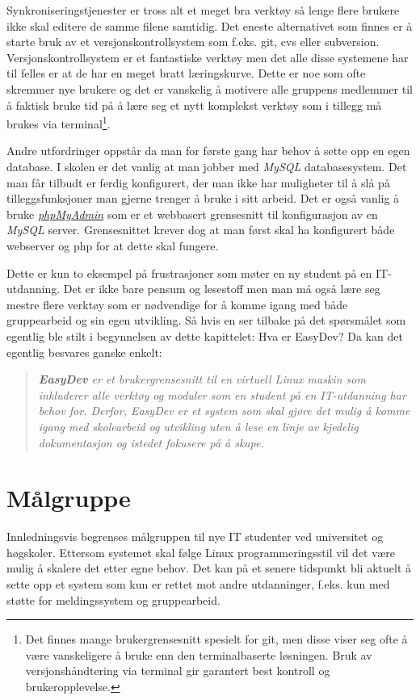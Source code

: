 Synkroniseringstjenester er tross alt et meget bra verktøy så lenge flere brukere ikke skal editere de samme filene samtidig. Det eneste alternativet som finnes er å starte bruk av et versjonskontrollsystem som f.eks. git, cvs eller subversion. Versjonskontrollsystem er et fantastiske verktøy men det alle disse systemene har til felles er at de har en meget bratt læringskurve. Dette er noe som ofte skremmer nye brukere og det er vanskelig å motivere alle gruppens medlemmer til å faktisk bruke tid på å lære seg et nytt komplekst verktøy som i tillegg må brukes via terminal\footnote{Det finnes mange brukergrensesnitt spesielt for git, men disse viser seg ofte å være vanskeligere å bruke enn den terminalbaserte løsningen. Bruk av versjonshåndtering via terminal gir garantert best kontroll og brukeropplevelse.}.

Andre utfordringer oppstår da man for første gang har behov å sette opp en egen database. I skolen er det vanlig at man jobber med \textit{MySQL} databasesystem. Det man får tilbudt er ferdig konfigurert, der man ikke har muligheter til å slå på tilleggsfunksjoner man gjerne trenger å bruke i sitt arbeid. Det er også vanlig å bruke \href{http://en.wikipedia.org/wiki/PhpMyAdmin}{\textit{phpMyAdmin}} som er et webbasert grensesnitt til konfigurasjon av en \textit{MySQL} server. Grensesnittet krever dog at man først skal ha konfigurert både webserver og php for at dette skal fungere.

Dette er kun to eksempel på frustrasjoner som møter en ny student på en IT-utdanning. Det er ikke bare pensum og lesestoff men man må også lære seg mestre flere verktøy som er nødvendige for å komme igang med både gruppearbeid og sin egen utvikling. Så hvis en ser tilbake på det spørsmålet som egentlig ble stilt i begynnelsen av dette kapittelet: Hva er EasyDev? Da kan det egentlig besvares ganske enkelt: 

\begin{quotation}
\emph{\textbf{EasyDev} er et brukergrensesnitt til en virtuell Linux maskin som inkluderer alle verktøy og moduler som en student på en IT-utdanning har behov for. Derfor, EasyDev er et system som skal gjøre det mulig å komme igang med skolearbeid og utvikling uten å lese en linje av kjedelig dokumentasjon og istedet fokusere på å skape.}
\end{quotation}


\section{Målgruppe} \label{sec:målgruppe}
Innledningsvis begrenses målgruppen til nye IT studenter ved universitet og høgskoler. Ettersom systemet skal følge Linux programmeringsstil\cite{book:unixprog} vil det være mulig å skalere det etter egne behov. Det kan på et senere tidspunkt bli aktuelt å sette opp et system som kun er rettet mot andre utdanninger, f.eks. kun med støtte for meldingssystem og gruppearbeid.


